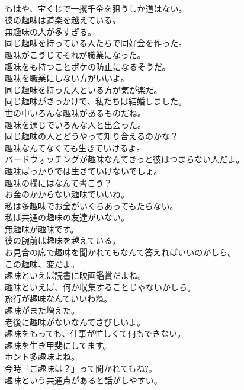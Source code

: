 \documentclass[8pt]{extreport}
\begin{document}
\begin{CJK}{UTF8}{min}
\\	もはや、宝くじで一攫千金を狙うしか道はない。	
\\	彼の趣味は道楽を越えている。	
\\	無趣味の人が多すぎる。	
\\	同じ趣味を持っている人たちで同好会を作った。	
\\	趣味がこうじてそれが職業になった。	
\\	趣味をも持つことボケの防止になるそうだ。	
\\	趣味を職業にしない方がいいよ。	
\\	同じ趣味を持った人といる方が気が楽だ。	
\\	同じ趣味がきっかけで、私たちは結婚しました。	
\\	世の中いろんな趣味があるものだね。	
\\	趣味を通じでいろんな人と出会った。	
\\	同じ趣味の人とどうやって知り合えるのかな？	
\\	趣味なんてなくても生きていけるよ。	
\\	バードウォッチングが趣味なんてきっと彼はつまらない人だよ。	
\\	趣味ばっかりでは生きていけないでしょ。	
\\	趣味の欄にはなんて書こう？	
\\	お金のかからない趣味でいいね。	
\\	私は多趣味でお金がいくらあってもたらない。	
\\	私は共通の趣味の友達がいない。	
\\	無趣味が趣味です。	
\\	彼の腕前は趣味を越えている。	
\\	お見合の席で趣味を聞かれてもなんて答えればいいのかしら。	
\\	この趣味、変だよ。	
\\	趣味といえば読書に映画鑑賞だよね。	
\\	趣味といえば、何か収集することじゃないかしら。	
\\	旅行が趣味なんていいわね。	
\\	趣味がまた増えた。	
\\	老後に趣味がないなんてさびしいよ。	
\\	趣味をもっても、仕事が忙しくて何もできない。	
\\	趣味を生き甲斐にしてます。	
\\	ホント多趣味よね。	
\\	今時「ご趣味は？」って聞かれてもね?。	
\\	趣味という共通点があると話がしやすい。	

\end{CJK}
\end{document}
